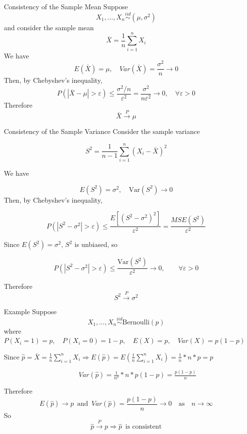 \documentclass[aspectratio=169,12pt]{beamer}
\begin{document}
\begin{frame}{Consistency of the Sample Mean}
Suppose $$X_1,\dots,X_n \overset{iid}{\sim} (\mu,\sigma^2)$$
and consider the sample mean $$\bar{X}=\frac1n\sum_{i=1}^nX_i$$
We have $$E(\bar{X})=\mu,\quad  Var(\bar{X})=\frac{\sigma^2}{n}\to0$$
Then, by Chebyshev's inequality,
$$P(|\bar{X}-\mu|>\varepsilon)\le\frac{\sigma^2/n}{\varepsilon^2}=\frac{\sigma^2}{n\varepsilon^2}\to0,\quad \forall \varepsilon>0$$
Therefore $$\bar{X}\xrightarrow{P}\mu$$
\end{frame}

\begin{frame}{Consistency of the Sample Variance}
Consider the sample variance

\vspace{-1em}
$$S^2=\frac{1}{n-1}\sum_{i=1}^n (X_i-\bar X)^2$$

\vspace{-1em}
We have

\vspace{-1em}
$$E(S^2)=\sigma^2,\quad\mathrm{Var}(S^2)\to 0$$
Then, by Chebyshev's inequality,

\vspace{-1em}
$$
P(|S^2-\sigma^2|>\varepsilon)
\le
\frac{E[(S^2-\sigma^2)^2]}{\varepsilon^2}
=
\frac{MSE(S^2)}{\varepsilon^2}
$$

Since \(E(S^2)=\sigma^2\), \(S^2\) is unbiased, so

\vspace{-1em}
$$
P(|S^2-\sigma^2|>\varepsilon)
\le
\frac{\mathrm{Var}(S^2)}{\varepsilon^2}
\to 0,
\qquad \forall \varepsilon>0
$$

Therefore
$$S^2 \xrightarrow{P} \sigma^2$$
\end{frame}

\begin{frame}{Example}
Suppose
\vspace{-1.2em}
$$X_1, \dots,X_n \overset{iid}{\sim}\mathrm{Bernoulli}(p)$$
where $P(X_i=1)=p, \quad P(X_i=0)=1-p, \quad E(X)=p, \quad  Var(X)=p(1-p)$

\vspace{0.8em}
Since $\hat p=\bar X=\frac1n\sum_{i=1}^n X_i\Rightarrow E(\hat p)=E(\frac1n\sum_{i=1}^n X_i)=\frac1n*n*p=p$

\vspace{0.8em}
$\qquad\qquad\qquad\qquad\qquad\quad Var(\hat{p})=\frac{1}{n^2}*n*p(1-p)=\frac{p(1-p)}{n}$

\vspace{1.2em}
Therefore
\vspace{-1.4em}
$$E(\hat p)\to p\,\,\,\text{and}\,\,\, Var(\hat p)=\frac{p(1-p)}{n}\to 0\quad \text{as}\quad n\to\infty$$
So $$\hat{p}\overset{P}{\longrightarrow}p\Rightarrow\hat{p}\,\,\, \text{is consistent}$$ 
\end{frame}
\end{document}

